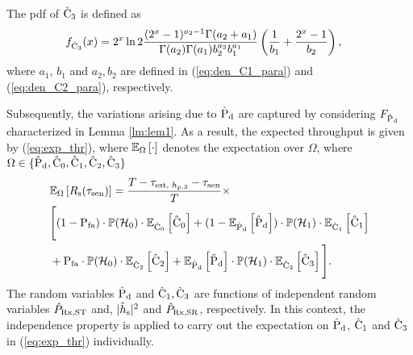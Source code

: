 \begin{lemma} \label{lm:lem6}
\normalfont
The pdf of $\ecth$ is defined as 
\begin{align}
\dcth(x) &= 2^x \ln 2 \frac{(2^x - 1)^{a_2 - 1} \Gamma(a_2 + a_1)}{\Gamma(a_2) \Gamma(a_1) b_2^{a_2} b_1^{a_1}} \left(\frac{1}{b_1} + \frac{2^x - 1}{b_2}\right), \label{eq:den_C3}
\end{align}
where $a_1$, $b_1$ and $a_2, b_2$ are defined in (\ref{eq:den_C1_para}) and (\ref{eq:den_C2_para}), respectively.
\end{lemma}
Subsequently, the variations arising due to $\epd$ are captured by considering $\fpd$ characterized in Lemma \ref{lm:lem1}. As a result, the expected throughput is given by (\ref{eq:exp_thr}), where $\e{\Omega}{\cdot}$ denotes the expectation over $\Omega$, where $\Omega \in \{ \epd, \ecz, \eco, \ectw, \ecth \}$ 
\begin{align}
&\e{\Omega}{\rs(\tsen)} = \frac{T - \testpr - \tsen}{T} \times \nonumber \\ 
&\Bigg[ (1 - \pfa) \cdot \phz \cdot \e{\ecz}{\ecz} +  (1 - \e{\epd}\epd) \cdot \pho \cdot \e{\eco}{\eco} \nonumber \\ &+  \pfa \cdot \phz \cdot \e{\ectw}{\ectw} +  \e{\epd}{\epd} \cdot \pho \cdot \e{\ecth}{\ecth} \Bigg]. \label{eq:exp_thr} 
\end{align}
The random variables $\epd$ and  $\eco, \ecth$ are functions of independent random variables $\eprcvd$ and, $\ephs$ and $\eprcvdsr$, respectively. In this context, the independence property is applied to carry out the expectation on $\epd$, $\eco$ and $\ecth$ in (\ref{eq:exp_thr}) individually.


